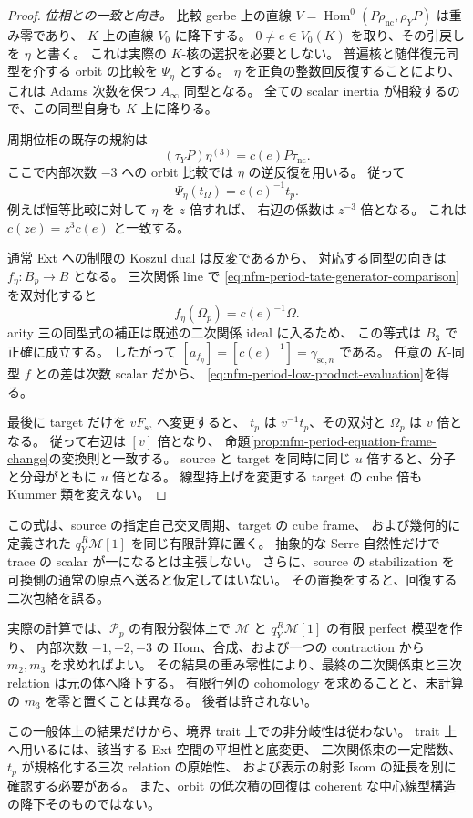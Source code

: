 \begin{proof}
\emph{位相との一致と向き。}
比較 gerbe 上の直線
$V=\operatorname{Hom}^0(P\rho_{\mathrm{nc}},\rho_YP)$ は重み零であり、
$K$ 上の直線 $V_0$ に降下する。
$0\ne e\in V_0(K)$ を取り、その引戻しを $\eta$ と書く。
これは実際の $K$-核の選択を必要としない。
普遍核と随伴復元同型を介する orbit の比較を $\Psi_\eta$ とする。
$\eta$ を正負の整数回反復することにより、
これは Adams 次数を保つ $A_\infty$ 同型となる。
全ての scalar inertia が相殺するので、この同型自身も $K$ 上に降りる。

周期位相の既存の規約は
\[
 (\tau_Y P)\eta^{(3)}=c(e)P\tau_{\mathrm{nc}}.
\]
ここで内部次数 $-3$ への orbit 比較では $\eta$ の逆反復を用いる。
従って
\begin{equation}\label{eq:nfm-period-tate-generator-comparison}
 \Psi_\eta(t_\Omega)=c(e)^{-1}t_p.
\end{equation}
例えば恒等比較に対して $\eta$ を $z$ 倍すれば、
右辺の係数は $z^{-3}$ 倍となる。
これは $c(ze)=z^3c(e)$ と一致する。

通常 Ext への制限の Koszul dual は反変であるから、
対応する同型の向きは $f_\eta:B_p\to B$ となる。
三次関係 line で \eqref{eq:nfm-period-tate-generator-comparison} を双対化すると
\[
 f_\eta(\Omega_p)=c(e)^{-1}\Omega.
\]
arity 三の同型式の補正は既述の二次関係 ideal に入るため、
この等式は $B_3$ で正確に成立する。
したがって $[a_{f_\eta}]=[c(e)^{-1}]=\gamma_{\mathrm{sc},n}$ である。
任意の $K$-同型 $f$ との差は次数 scalar だから、
\eqref{eq:nfm-period-low-product-evaluation}を得る。

最後に target だけを $vF_{\mathrm{sc}}$ へ変更すると、
$t_p$ は $v^{-1}t_p$、その双対と $\Omega_p$ は $v$ 倍となる。
従って右辺は $[v]$ 倍となり、
命題\ref{prop:nfm-period-equation-frame-change}の変換則と一致する。
source と target を同時に同じ $u$ 倍すると、分子と分母がともに $u$ 倍となる。
線型持上げを変更する target の cube 倍も Kummer 類を変えない。
\end{proof}

\begin{remark}[この評価式で残る計算と相対的な条件]
\label{rem:nfm-period-low-product-scope}
この式は、source の指定自己交叉周期、target の cube frame、
および幾何的に定義された $q_Y^R\mathcal M[1]$ を同じ有限計算に置く。
抽象的な Serre 自然性だけで trace の scalar が一になるとは主張しない。
さらに、source の stabilization を可換側の通常の原点へ送ると仮定してはいない。
その置換をすると、回復する二次包絡を誤る。

実際の計算では、$\mathscr P_p$ の有限分裂体上で $\mathcal M$ と
$q_Y^R\mathcal M[1]$ の有限 perfect 模型を作り、
内部次数 $-1,-2,-3$ の Hom、合成、および一つの contraction から
$m_2,m_3$ を求めればよい。
その結果の重み零性により、最終の二次関係束と三次 relation は元の体へ降下する。
有限行列の cohomology を求めることと、未計算の $m_3$ を零と置くことは異なる。
後者は許されない。

この一般体上の結果だけから、境界 trait 上での非分岐性は従わない。
trait 上へ用いるには、該当する Ext 空間の平坦性と底変更、
二次関係束の一定階数、$t_p$ が規格化する三次 relation の原始性、
および表示の射影 Isom の延長を別に確認する必要がある。
また、orbit の低次積の回復は coherent な中心線型構造の降下そのものではない。
\end{remark}

